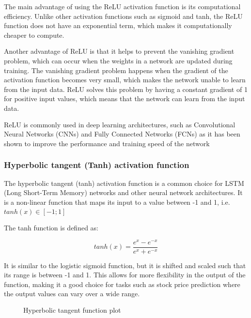 \documentclass[a4paper]{article}
\begin{document}
The main advantage of using the ReLU activation function is its computational efficiency. Unlike other activation functions such as sigmoid and tanh, the ReLU function does not have an exponential term, which makes it computationally cheaper to compute.

Another advantage of ReLU is that it helps to prevent the vanishing gradient problem, which can occur when the weights in a network are updated during training. The vanishing gradient problem happens when the gradient of the activation function becomes very small, which makes the network unable to learn from the input data. ReLU solves this problem by having a constant gradient of 1 for positive input values, which means that the network can learn from the input data.

ReLU is commonly used in deep learning architectures, such as Convolutional Neural Networks (CNNs) and Fully Connected Networks (FCNs) as it has been shown to improve the performance and training speed of the network
\subsubsection{Hyperbolic tangent (Tanh) activation function} \label{tanh}

The hyperbolic tangent (tanh) activation function is a common choice for LSTM (Long Short-Term Memory) networks and other neural network architectures. It is a non-linear function that maps its input to a value between -1 and 1, i.e. $tanh(x) \in [-1;1]$

The tanh function is defined as:

$$
tanh(x) = \frac{e^x-e^{-x}}{e^x+e^{-x}}
$$

It is similar to the logistic sigmoid function, but it is shifted and scaled such that its range is between -1 and 1. This allows for more flexibility in the output of the function, making it a good choice for tasks such as stock price prediction where the output values can vary over a wide range.

\begin{figure}[!h]
\centering
{}
\caption{Hyperbolic tangent function plot}
\end{figure}
\end{document}
